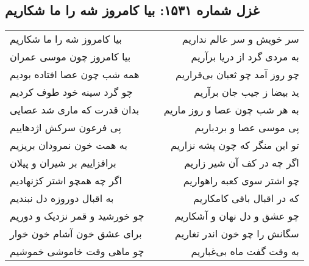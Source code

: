 \begin{center}
\section*{غزل شماره ۱۵۳۱: بیا کامروز شه را ما شکاریم}
\label{sec:1531}
\begin{longtable}{l p{0.5cm} r}
بیا کامروز شه را ما شکاریم
&&
سر خویش و سر عالم نداریم
\\
بیا کامروز چون موسی عمران
&&
به مردی گرد از دریا برآریم
\\
همه شب چون عصا افتاده بودیم
&&
چو روز آمد چو ثعبان بی‌قراریم
\\
چو گرد سینه خود طوف کردیم
&&
ید بیضا ز جیب جان برآریم
\\
بدان قدرت که ماری شد عصایی
&&
به هر شب چون عصا و روز ماریم
\\
پی فرعون سرکش اژدهاییم
&&
پی موسی عصا و بردباریم
\\
به همت خون نمرودان بریزیم
&&
تو این منگر که چون پشه نزاریم
\\
برافزاییم بر شیران و پیلان
&&
اگر چه در کف آن شیر زاریم
\\
اگر چه همچو اشتر کژنهادیم
&&
چو اشتر سوی کعبه راهواریم
\\
به اقبال دوروزه دل نبندیم
&&
که در اقبال باقی کامکاریم
\\
چو خورشید و قمر نزدیک و دوریم
&&
چو عشق و دل نهان و آشکاریم
\\
برای عشق خون آشام خون خوار
&&
سگانش را چو خون اندر تغاریم
\\
چو ماهی وقت خاموشی خموشیم
&&
به وقت گفت ماه بی‌غباریم
\\
\end{longtable}
\end{center}
